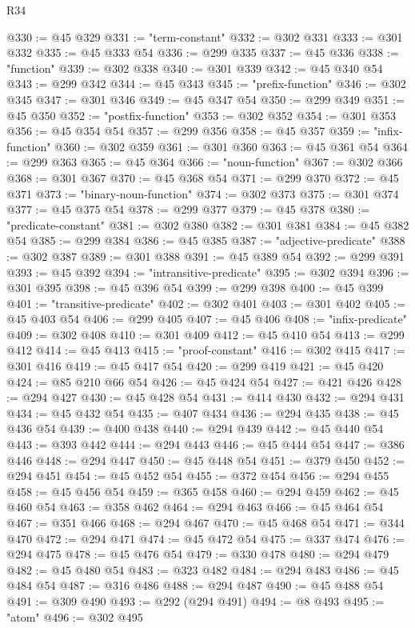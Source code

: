 \begin{lexlean}{R34}
\begin{coremodule}
@330 := @45 @329
@331 := "term-constant"
@332 := @302 @331
@333 := @301 @332
@335 := @45 @333 @54
@336 := @299 @335
@337 := @45 @336
@338 := "function"
@339 := @302 @338
@340 := @301 @339
@342 := @45 @340 @54
@343 := @299 @342
@344 := @45 @343
@345 := "prefix-function"
@346 := @302 @345
@347 := @301 @346
@349 := @45 @347 @54
@350 := @299 @349
@351 := @45 @350
@352 := "postfix-function"
@353 := @302 @352
@354 := @301 @353
@356 := @45 @354 @54
@357 := @299 @356
@358 := @45 @357
@359 := "infix-function"
@360 := @302 @359
@361 := @301 @360
@363 := @45 @361 @54
@364 := @299 @363
@365 := @45 @364
@366 := "noun-function"
@367 := @302 @366
@368 := @301 @367
@370 := @45 @368 @54
@371 := @299 @370
@372 := @45 @371
@373 := "binary-noun-function"
@374 := @302 @373
@375 := @301 @374
@377 := @45 @375 @54
@378 := @299 @377
@379 := @45 @378
@380 := "predicate-constant"
@381 := @302 @380
@382 := @301 @381
@384 := @45 @382 @54
@385 := @299 @384
@386 := @45 @385
@387 := "adjective-predicate"
@388 := @302 @387
@389 := @301 @388
@391 := @45 @389 @54
@392 := @299 @391
@393 := @45 @392
@394 := "intransitive-predicate"
@395 := @302 @394
@396 := @301 @395
@398 := @45 @396 @54
@399 := @299 @398
@400 := @45 @399
@401 := "transitive-predicate"
@402 := @302 @401
@403 := @301 @402
@405 := @45 @403 @54
@406 := @299 @405
@407 := @45 @406
@408 := "infix-predicate"
@409 := @302 @408
@410 := @301 @409
@412 := @45 @410 @54
@413 := @299 @412
@414 := @45 @413
@415 := "proof-constant"
@416 := @302 @415
@417 := @301 @416
@419 := @45 @417 @54
@420 := @299 @419
@421 := @45 @420
@424 := @85 @210 @66 @54
@426 := @45 @424 @54
@427 := @421 @426
@428 := @294 @427
@430 := @45 @428 @54
@431 := @414 @430
@432 := @294 @431
@434 := @45 @432 @54
@435 := @407 @434
@436 := @294 @435
@438 := @45 @436 @54
@439 := @400 @438
@440 := @294 @439
@442 := @45 @440 @54
@443 := @393 @442
@444 := @294 @443
@446 := @45 @444 @54
@447 := @386 @446
@448 := @294 @447
@450 := @45 @448 @54
@451 := @379 @450
@452 := @294 @451
@454 := @45 @452 @54
@455 := @372 @454
@456 := @294 @455
@458 := @45 @456 @54
@459 := @365 @458
@460 := @294 @459
@462 := @45 @460 @54
@463 := @358 @462
@464 := @294 @463
@466 := @45 @464 @54
@467 := @351 @466
@468 := @294 @467
@470 := @45 @468 @54
@471 := @344 @470
@472 := @294 @471
@474 := @45 @472 @54
@475 := @337 @474
@476 := @294 @475
@478 := @45 @476 @54
@479 := @330 @478
@480 := @294 @479
@482 := @45 @480 @54
@483 := @323 @482
@484 := @294 @483
@486 := @45 @484 @54
@487 := @316 @486
@488 := @294 @487
@490 := @45 @488 @54
@491 := @309 @490
@493 := @292 (@294 @491)
@494 := @8 @493
@495 := "atom"
@496 := @302 @495

\end{coremodule}
\end{lexlean}
